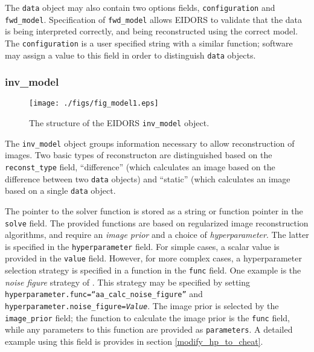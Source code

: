 \documentclass[12pt]{iopart}
\begin{document}
The {\tt data} object may also contain two options fields,
{\tt configuration} and {\tt fwd\_model}. Specification
of {\tt fwd\_model} allows EIDORS to validate that the
data is being interpreted correctly, and being reconstructed
using the correct model. The {\tt configuration} is
a user specified string with a similar function; software
may assign a value to this field in order to distinguish
{\tt data} objects.


\subsubsection{inv\_model}

%
%
\begin{figure}[th]
\begin{flushright}
\texttt{[image: ./figs/fig\_model1.eps]}
\caption{\small The structure of the EIDORS {\tt inv\_model} object.
\label{fig:inv_model}
 }
\end{flushright}
\end{figure}

The {\tt inv\_model} object groups information necessary to 
allow reconstruction of images. Two basic types of reconstructon
are distinguished based on the {\tt reconst\_type} field, 
``difference'' (which calculates an image based on the difference
between two {\tt data} objects) and ``static'' (which calculates an
image based on a single {\tt data} object.

The pointer to the solver function is stored as a string or function
pointer in the {\tt solve} field. The provided functions are based
on regularized image reconstruction algorithms, and require 
an {\em image prior} and a choice of {\em hyperparameter}. 
The latter is specified in the {\tt hyperparameter} field. For
simple cases, a scalar value is provided in the {\tt value} field.
However, for more complex cases, a hyperparameter selection strategy
is specified in a function in the {\tt func} field. One example
is the {\em noise figure} strategy of \cite{Adler_and_Guardo_1996}.
This strategy may be specified by setting
 {\tt hyperparameter.func=``aa\_calc\_noise\_figure''}
and 
 {\tt hyperparameter.noise\_figure=\em Value}.
The image prior is selected by the {\tt image\_prior} field;
the function to calculate the image prior is the {\tt func}
field, while
any parameters to this function are provided as {\tt parameters}.
A detailed example using this field is provides in
section \ref{modify_hp_to_cheat}.
\end{document}

